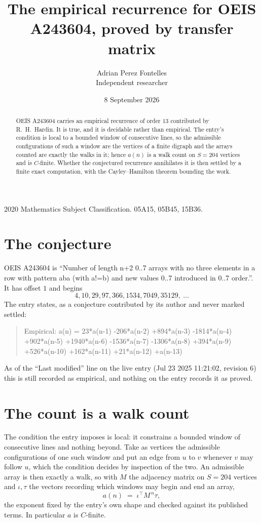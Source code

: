 \documentclass[11pt,a4paper]{article}
\title{The empirical recurrence for OEIS A243604, proved by transfer matrix}
\author{Adrian Perez Fontelles\\ \small Independent researcher}
\date{8 September 2026}
\theoremstyle{plain}
\theoremstyle{definition}
\begin{document}
\maketitle

\begin{abstract}
OEIS A243604 carries an empirical recurrence of order $13$ contributed by R.~H.~Hardin. It is
true, and it is decidable rather than empirical. The entry's condition is local to a bounded window of consecutive lines, so
the admissible configurations of such a window are the vertices of a finite digraph and the
arrays counted are exactly the walks in it; hence $a(n)$ is a walk count on $S=204$ vertices
and is $C$-finite. Whether the conjectured recurrence annihilates it is then settled by a
finite exact computation, with the Cayley--Hamilton theorem bounding the work.
\end{abstract}

\noindent\small 2020 Mathematics Subject Classification. 05A15, 05B45, 15B36.\normalsize

\section{The conjecture}

OEIS A243604 is ``Number of length n+2 0..7 arrays with no three elements in a row with pattern aba (with a!=b) and new values 0..7 introduced in 0..7 order.''. It has offset $1$ and begins
\[
4, 10, 29, 97, 366, 1534, 7049, 35129,\ \dots
\]
The entry states, as a conjecture contributed by its author and never marked settled:
\begin{quote}
Empirical: a(n) = 23*a(n-1) -206*a(n-2) +894*a(n-3) -1814*a(n-4) +902*a(n-5) +1940*a(n-6) -1536*a(n-7) -1306*a(n-8) +394*a(n-9) +526*a(n-10) +162*a(n-11) +21*a(n-12) +a(n-13)
\end{quote}
As of the ``Last modified'' line on the live entry (Jul 23 2025 11:21:02, revision 6) this is still
recorded as empirical, and nothing on the entry records it as proved.

\section{The count is a walk count}

The condition the entry imposes is local: it constrains a bounded window of consecutive lines and nothing beyond. Take as
vertices the admissible configurations of one such window and put an edge from $u$ to $v$
whenever $v$ may follow $u$, which the condition decides by inspection of the two. An
admissible array is then exactly a walk, so with $M$ the adjacency matrix on $S=204$ vertices
and $\iota,\tau$ the vectors recording which windows may begin and end an array,
\[
a(n)\;=\;\iota^{\!\top}M^{\,n}\tau ,
\]
the exponent fixed by the entry's own shape and checked against its published terms. In
particular $a$ is $C$-finite.
\end{document}
